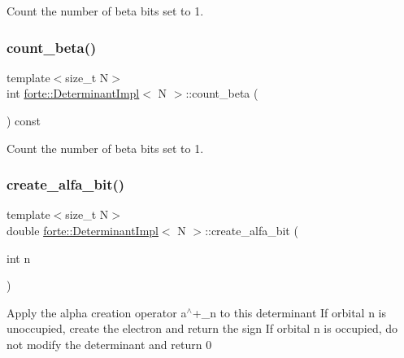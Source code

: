 Count the number of beta bits set to 1. 

\mbox{\label{classforte_1_1_determinant_impl_acd8866f4054bf89589213992668eb3d2}} 
\subsubsection{\texorpdfstring{count\+\_\+beta()}{count\_beta()}}
{\footnotesize\ttfamily template$<$size\+\_\+t N$>$ \\
int \mbox{\hyperlink{classforte_1_1_determinant_impl}{forte\+::\+Determinant\+Impl}}$<$ N $>$\+::count\+\_\+beta (\begin{DoxyParamCaption}{ }\end{DoxyParamCaption}) const\hspace{0.3cm}{\ttfamily [inline]}}



Count the number of beta bits set to 1. 

\mbox{\label{classforte_1_1_determinant_impl_af04a9600e0092df7024fed3a1aa4e5a4}} 
\subsubsection{\texorpdfstring{create\+\_\+alfa\+\_\+bit()}{create\_alfa\_bit()}}
{\footnotesize\ttfamily template$<$size\+\_\+t N$>$ \\
double \mbox{\hyperlink{classforte_1_1_determinant_impl}{forte\+::\+Determinant\+Impl}}$<$ N $>$\+::create\+\_\+alfa\+\_\+bit (\begin{DoxyParamCaption}\item[{int}]{n }\end{DoxyParamCaption})\hspace{0.3cm}{\ttfamily [inline]}}

Apply the alpha creation operator a$^\wedge$+\+\_\+n to this determinant If orbital n is unoccupied, create the electron and return the sign If orbital n is occupied, do not modify the determinant and return 0 \mbox{\label{classforte_1_1_determinant_impl_a029be4ce6d50df77300096e58a83a42f}} 
